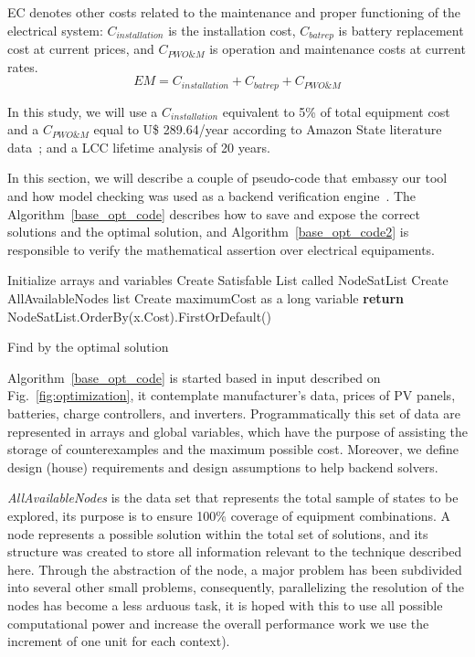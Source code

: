 \documentclass[10pt,journal,compsoc]{IEEEtran}
\begin{document}
EC denotes other costs related to the maintenance and proper functioning of the electrical system: $C_{installation}$ is the installation cost, $C_{batrep}$ is battery replacement cost at current prices, and $C_{PWO\&M}$ is operation and maintenance costs at current rates.
\begin{equation}
\label{eq:EquipamentMaintenence}
EM = C_{installation} + C_{batrep} + C_{PWO\&M}
\end{equation}

In this study, we will use a $C_{installation}$ equivalent to 5\% of total equipment cost and a $C_{PWO\&M}$ equal to U\$ 289.64/year according to Amazon State literature data~\cite{Agrener2013}; and a LCC lifetime analysis of 20 years.

 In this section, we will describe a couple of pseudo-code that embassy our tool and how model checking was used as a backend verification engine~\cite{DBLP:journals/corr/abs-1909-13139}. The Algorithm~\ref{base_opt_code} describes how to save and expose the correct solutions and the optimal solution, and Algorithm~\ref{base_opt_code2} is responsible to verify the mathematical assertion over electrical equipaments.

\begin{algorithm}[ht]
\SetAlgoLined
{}
 Initialize arrays and variables\;
Create Satisfable List called NodeSatList\;
Create AllAvailableNodes list\;
Create maximumCost as a long variable\;
\textbf{return} NodeSatList.OrderBy(x.Cost).FirstOrDefault()
\caption{Find by the optimal solution}
\label{base_opt_code}
\end{algorithm}

Algorithm~\ref{base_opt_code} is started based in input described on Fig.~\ref{fig:optimization}, it contemplate manufacturer’s data, prices of PV panels, batteries, charge controllers, and inverters. Programmatically this set of data are represented in arrays and global variables, which have the purpose of assisting the storage of counterexamples and the maximum possible cost. Moreover, we define design (house) requirements and design assumptions to help backend solvers. 

\textit{AllAvailableNodes} is the data set that represents the total sample of states to be explored, its purpose is to ensure 100\% coverage of equipment combinations. A node represents a possible solution within the total set of solutions, and its structure was created to store all information relevant to the technique described here. Through the abstraction of the node, a major problem has been subdivided into several other small problems, consequently, parallelizing the resolution of the nodes has become a less arduous task, it is hoped with this to use all possible computational power and increase the overall performance work we use the increment of one unit for each context).
\end{document}
